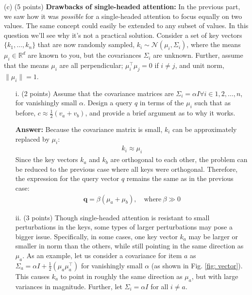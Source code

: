 \documentclass[letterpaper,12pt]{article}
\begin{document}
	\noindent(c) (5 points) \textbf{Drawbacks of single-headed attention:} In the previous part, we saw how it was \textit{possible} for a single-headed attention to focus equally on two values. The same concept could easily be extended to any subset of values. In this question we'll see why it's not a practical solution. Consider a set of key vectors $\{k_1, \ldots , k_n\}$ that are now randomly sampled, $k_i \sim \mathcal{N}(μ_i,\Sigma_i)$, where the means $μ_i \in \mathbb{R}^d$ are known to you, but the covariances $\Sigma_i$ are unknown. Further, assume that the means $μ_i$ are all perpendicular; $\mu^\top_i \mu_j = 0$ if $i \neq j$, and unit norm, $\|\mu_i\| = 1$.
	
	\begin{itemize}
	\item[i.]
		(2 points) Assume that the covariance matrices are $\Sigma_i = \alpha I \forall i \in {1, 2, \ldots , n}$, for vanishingly small $\alpha$. Design a query $q$ in terms of the $\mu_i$ such that as before, $c \approx \frac{1}{2}(v_a +v_b)$, and provide a brief argument as to why it works.
		
		\textcolor{blue!70}{\textbf{Answer:} Because the covariance matrix is small, $k_i$ can be approximately replaced by $\mu_i$:
		\begin{equation*}
			\begin{aligned}
				k_i \approx \mu_i
			\end{aligned}
		\end{equation*}
		Since the key vectors $k_a$ and $k_b$ are orthogonal to each other, the problem can be reduced to the previous case where all keys were orthogonal. Therefore, the expression for the query vector $q$ remains the same as in the previous case: 
		\begin{equation*}
			\begin{aligned}
				\mathbf{q}=\beta(\mu_a+\mu_b), \quad \text{where} \ \beta \gg 0
			\end{aligned}
		\end{equation*}
		}
		
	\item[ii.]
		(3 points) Though single-headed attention is resistant to small perturbations in the keys, some types of larger perturbations may pose a bigger issue. Specifically, in some cases, one key vector $k_a$ may be larger or smaller in norm than the others, while still pointing in the same direction as $\mu_a$. As an example, let us consider a covariance for item $a$ as $\Sigma_a = \alpha I+ \frac{1}{2}(\mu_a\mu^\top_a )$ for vanishingly small $\alpha$ (as shown in Fig. \ref{fig: vector}). This causes $k_a$ to point in roughly the same direction as $\mu_a$, but with large variances in magnitude. Further, let $\Sigma_i = \alpha I$ for all $i \neq a$.
		

\end{itemize}
\end{document}
